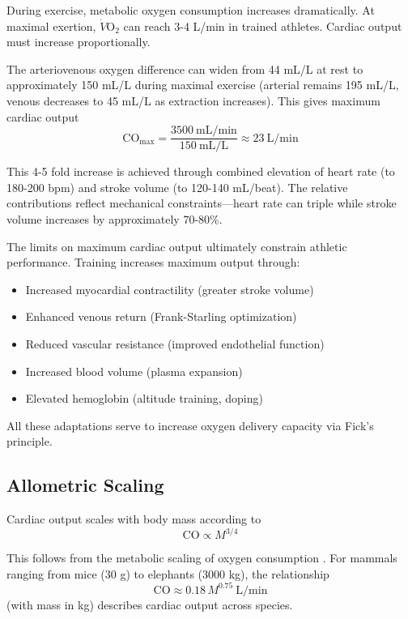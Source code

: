 \documentclass[12pt,a4paper]{article}
\theoremstyle{remark}
\begin{document}
During exercise, metabolic oxygen consumption increases dramatically. At maximal exertion, $\dot{V}\mathrm{O}_{2}$ can reach 3-4 L/min in trained athletes. Cardiac output must increase proportionally.

The arteriovenous oxygen difference can widen from 44 mL/L at rest to approximately 150 mL/L during maximal exercise (arterial remains 195 mL/L, venous decreases to 45 mL/L as extraction increases). This gives maximum cardiac output
\begin{equation}
\mathrm{CO}_{\max} = \frac{3500~\mathrm{mL/min}}{150~\mathrm{mL/L}} \approx 23~\mathrm{L/min}
\end{equation}

This 4-5 fold increase is achieved through combined elevation of heart rate (to 180-200 bpm) and stroke volume (to 120-140 mL/beat). The relative contributions reflect mechanical constraints—heart rate can triple while stroke volume increases by approximately 70-80\%.

The limits on maximum cardiac output ultimately constrain athletic performance. Training increases maximum output through:
\begin{itemize}
\item Increased myocardial contractility (greater stroke volume)
\item Enhanced venous return (Frank-Starling optimization)
\item Reduced vascular resistance (improved endothelial function)
\item Increased blood volume (plasma expansion)
\item Elevated hemoglobin (altitude training, doping)
\end{itemize}

All these adaptations serve to increase oxygen delivery capacity via Fick's principle.

\subsection{Allometric Scaling}

Cardiac output scales with body mass according to
\begin{equation}
\mathrm{CO} \propto M^{3/4}
\end{equation}

This follows from the metabolic scaling of oxygen consumption \cite{west1997general}. For mammals ranging from mice (30 g) to elephants (3000 kg), the relationship
\begin{equation}
\mathrm{CO} \approx 0.18 \, M^{0.75}~\mathrm{L/min}
\end{equation}
(with mass in kg) describes cardiac output across species.
\end{document}
